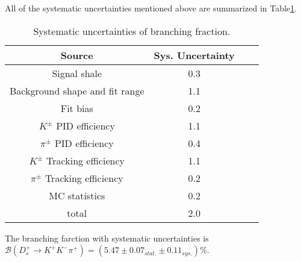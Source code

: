 {    All of the systematic uncertainties mentioned above are summarized in Table\ref{BF-Sys}.
    \begin{table}
        \caption{Systematic uncertainties of branching fraction.}
        \label{BF-Sys}
        \begin{center}
            \begin{tabular}{cccc}
                \toprule\toprule
                Source   & Sys. Uncertainty\\
                \hline
                Signal shale                        & 0.3 \\
                Background shape and fit range      & 1.1 \\
                Fit bias                            & 0.2 \\
                $K^{\pm}$ PID efficiency            & 1.1 \\
                $\pi^{\pm}$ PID efficiency          & 0.4 \\
                $K^{\pm}$ Tracking efficiency       & 1.1 \\
                $\pi^{\pm}$ Tracking efficiency     & 0.2 \\
                MC statistics                       & 0.2 \\
                \hline
                total                               & 2.0 \\
                \bottomrule\bottomrule
            \end{tabular}
        \end{center}
    \end{table}

    The branching farction with systematic uncertainties is $\mathcal{B}(D_{s}^{+} \rightarrow K^{+}K^{-}\pi^{+})=(5.47\pm0.07_{stat.}\pm0.11_{sys.})\%$.




}
